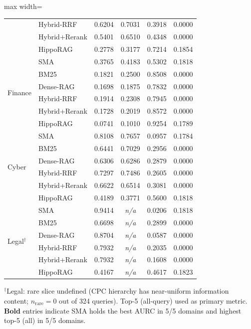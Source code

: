 \documentclass[pdflatex,sn-nature]{sn-jnl}
\begin{document}
\begin{appendices}
\begin{table}[htbp]
\begin{adjustbox}{max width=\textwidth}
\begin{tabular}{llcccc}
  & Hybrid-RRF       & 0.6204 & 0.7031 & 0.3918 & 0.0000 \\
  & Hybrid+Rerank    & 0.5401 & 0.6510 & 0.4348 & 0.0000 \\
  & HippoRAG         & 0.2778 & 0.3177 & 0.7214 & 0.1854 \\
\midrule
\multirow{6}{*}{Finance}
  & SMA              & 0.3765 & 0.4183 & 0.5302 & 0.1818 \\
  & BM25             & 0.1821 & 0.2500 & 0.8508 & 0.0000 \\
  & Dense-RAG        & 0.1698 & 0.1875 & 0.7832 & 0.0000 \\
  & Hybrid-RRF       & 0.1914 & 0.2308 & 0.7945 & 0.0000 \\
  & Hybrid+Rerank    & 0.1728 & 0.2019 & 0.8572 & 0.0000 \\
  & HippoRAG         & 0.0741 & 0.1010 & 0.9254 & 0.1789 \\
\midrule
\multirow{6}{*}{Cyber}
  & SMA              & 0.8108 & 0.7657 & 0.0957 & 0.1784 \\
  & BM25             & 0.6441 & 0.7029 & 0.2956 & 0.0000 \\
  & Dense-RAG        & 0.6306 & 0.6286 & 0.2879 & 0.0000 \\
  & Hybrid-RRF       & 0.7297 & 0.7486 & 0.2605 & 0.0000 \\
  & Hybrid+Rerank    & 0.6622 & 0.6514 & 0.3081 & 0.0000 \\
  & HippoRAG         & 0.4189 & 0.3771 & 0.5600 & 0.1818 \\
\midrule
\multirow{6}{*}{Legal$^\dagger$}
  & SMA              & 0.9414 & \textit{n/a} & 0.0206 & 0.1818 \\
  & BM25             & 0.6698 & \textit{n/a} & 0.2899 & 0.0000 \\
  & Dense-RAG        & 0.8704 & \textit{n/a} & 0.0587 & 0.0000 \\
  & Hybrid-RRF       & 0.7932 & \textit{n/a} & 0.2035 & 0.0000 \\
  & Hybrid+Rerank    & 0.7932 & \textit{n/a} & 0.1608 & 0.0000 \\
  & HippoRAG         & 0.4167 & \textit{n/a} & 0.4617 & 0.1823 \\
\bottomrule
\end{tabular}\end{adjustbox}
\begin{flushleft}
{\footnotesize
$^\dagger$Legal: rare slice undefined (CPC hierarchy has near-uniform information content;
$n_\text{rare}=0$ out of 324 queries). Top-5 (all-query) used as primary metric.
\textbf{Bold} entries indicate SMA holds the best AURC in 5/5 domains and highest
top-5 (all) in 5/5 domains.}
\end{flushleft}
\label{tab:ed1_domain_metrics}
\end{table}



\end{appendices}
\end{document}

